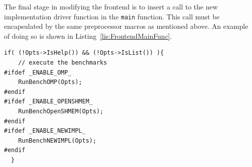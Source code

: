 \documentclass{article}
\begin{document}
The final stage in modifying the frontend is to insert a call to the new 
implementation driver function in the \texttt{main} function.  This call 
must be encapsulated by the same preprocessor macros as mentioned 
above.  An example of doing so is shown in Listing~\ref{lis:FrontendMainFunc}.  

\clearpage
\vspace{0.125in}
\begin{lstlisting}[frame=single,style=base,caption={Frontend Main Modifications},captionpos=b,label={lis:FrontendMainFunc}]
 if( (!Opts->IsHelp()) && (!Opts->IsList()) ){
    // execute the benchmarks
#ifdef _ENABLE_OMP_
    RunBenchOMP(Opts);
#endif
#ifdef _ENABLE_OPENSHMEM_
    RunBenchOpenSHMEM(Opts);
#endif
#ifdef _ENABLE_NEWIMPL_
    RunBenchNEWIMPL(Opts);
#endif
  }
\end{lstlisting}


\clearpage
%
%


\end{document}
